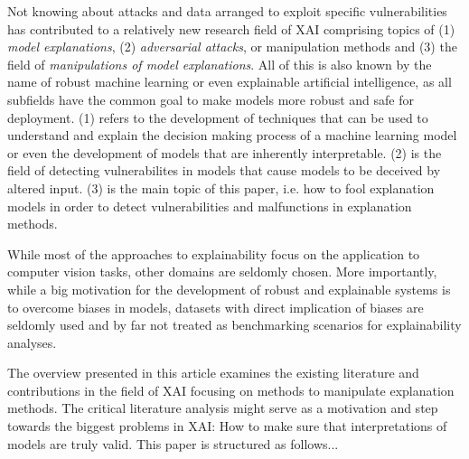 Not knowing about attacks and data arranged to exploit specific vulnerabilities has contributed to a relatively new  research field of XAI comprising topics of (1) \textit{model explanations}, (2) \textit{adversarial attacks}, or manipulation methods and (3) the field of \textit{manipulations of model explanations}. All of this is also known by the name of robust machine learning or even explainable artificial intelligence, as all subfields have the common goal to make models more robust and safe for deployment. 
(1) refers to the development of techniques that can be used to understand and explain the decision making process of a machine learning model or even the development of models that are inherently interpretable. (2) is the field of detecting vulnerabilites in models that cause models to be deceived by altered input. 
(3) is the main topic of this paper, i.e. how to fool explanation models in order to detect vulnerabilities and malfunctions in explanation methods. 


While most of the approaches to explainability focus on the application to computer vision tasks, other domains are seldomly chosen. 
More importantly, while a big motivation for the development of robust and explainable systems is to overcome biases in models, datasets with 
direct implication of biases are seldomly used and by far not treated as benchmarking scenarios for explainability analyses.  






The overview presented in this article examines the existing literature and contributions in the field of XAI focusing on methods to manipulate explanation methods.  
The critical literature analysis might serve as a motivation and step towards the biggest problems in XAI: How to make sure that interpretations of models are truly valid. 
This paper is structured as follows... 
